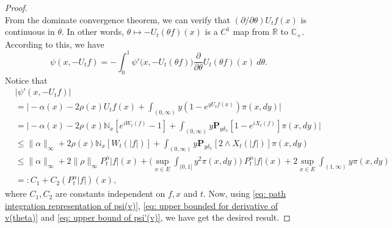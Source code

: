 \documentclass[12pt,a4paper]{amsart}
\theoremstyle{plain}
\theoremstyle{definition}
\numberwithin{equation}{section}
\begin{document}
\begin{proof}
\begin{equation}
\end{equation}
    From the dominate convergence theorem, we can verify that $(\partial/\partial \theta)U_tf(x)$ is continuous in $\theta$.
    In other words, $\theta \mapsto -U_t(\theta f)(x)$ is a $C^1$ map from $\mathbb R$ to $\mathbb C_+$.
    According to this, we have
\begin{equation}
\label{eq: path integration representation of psi(v)}
    \psi(x,-U_tf) = -\int_0^1 \psi'\big(x,-U_t(\theta f)\big) \frac{\partial}{\partial \theta} U_t(\theta f)(x)~d\theta.
\end{equation}
    Notice that
\begin{equation}
\label{eq: upper bound of psi'(v)}
\begin{split}
    &|\psi'(x, -U_tf)|
    \\&= \Big| -\alpha(x)- 2\rho(x) U_tf(x)+ \int_{(0,\infty)} y (1- e^{y U_tf(x)} ) \pi(x,dy)\Big|
    \\&= \Big| - \alpha(x)- 2\rho(x)\mathbb N_x[e^{i W_{t}(f)} - 1]  + \int_{(0,\infty)} y \mathbf P_{y \delta_x}[1-e^{i X_{t}(f)}] \pi(x,dy) \Big|
\\ &\leq \|\alpha\|_\infty + 2\rho(x)\mathbb N_x[W_t(|f|)]+ \int_{(0,\infty)} y\mathbf P_{y\delta_x}[2\wedge X_t(|f|)] \pi(x,dy)
\\ &\leq \|\alpha\|_\infty + 2\|\rho\|_\infty
P^\alpha_t |f|(x) + \Big(\sup_{x\in E}\int_{(0,1]}y^2 \pi(x,dy)\Big)~P^\alpha_t |f|(x)
  + 2\sup_{x\in E}\int_{(1,\infty)} y \pi(x,dy)
\\ &=: C_1 + C_2(P^\alpha_t |f|)(x),
\end{split}
\end{equation}
    where $C_1, C_2$ are constants independent on $f,x$ and $t$.
    Now, using \eqref{eq: path integration representation of psi(v)}, \eqref{eq: upper bounded for derivative of v(theta)} and \eqref{eq: upper bound of psi'(v)}, we have get the desired result.
\end{proof}
\end{document}
